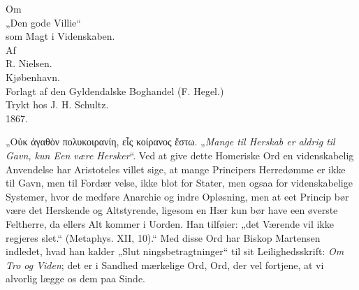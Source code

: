 \documentclass[12pt]{book}
\newcommand{\opage}[1]{\marginnote{\footnotesize\textit{[#1]}}}
\begin{document}
\frontmatter
\begin{titlepage}
\centering
\vspace*{3cm}
{\LARGE Om}\\[1.5em]
{\Huge „Den gode Villie“}\\[1.5em]
{\LARGE som Magt i Videnskaben.}\\[2em]
{\small Af}\\[1em]
{\large R. Nielsen.}\\[5em]
Kjøbenhavn.\\[0.5em]
Forlagt af den Gyldendalske Boghandel (F. Hegel.)\\[0.3em]
{\footnotesize Trykt hos J. H. Schultz.}\\[0.5em]
1867.
\end{titlepage}

\mainmatter
{}


\opage{1}\setcounter{footnote}{0}%
„Οὐκ ἀγαθὸν πολυκοιρανίη, εἷς κοίρανος ἔστω.
„\emph{Mange til Herskab er aldrig til Gavn, kun Een
være Hersker}“. Ved at give dette Homeriske Ord en
videnskabelig Anvendelse har Aristoteles villet sige, at mange
Principers Herredømme er ikke til Gavn, men til Fordær\-%
velse, ikke blot for Stater, men ogsaa for videnskabelige
Systemer, hvor de medføre Anarchie og indre Opløsning,
men at eet Princip bør være det Herskende og Altstyrende,
ligesom en Hær kun bør have een øverste Feltherre, da
ellers Alt kommer i Uorden. Han tilføier: „det Værende
vil ikke regjeres slet.“ (Metaphys. XII, 10).“ Med disse
Ord har Biskop Martensen indledet, hvad han kalder „Slut\-%
ningsbetragtninger“ til sit Leilighedsskrift: \emph{Om Tro og
Viden}; det er i Sandhed mærkelige Ord, Ord, der vel
fortjene, at vi alvorlig lægge os dem paa Sinde.
\end{document}
